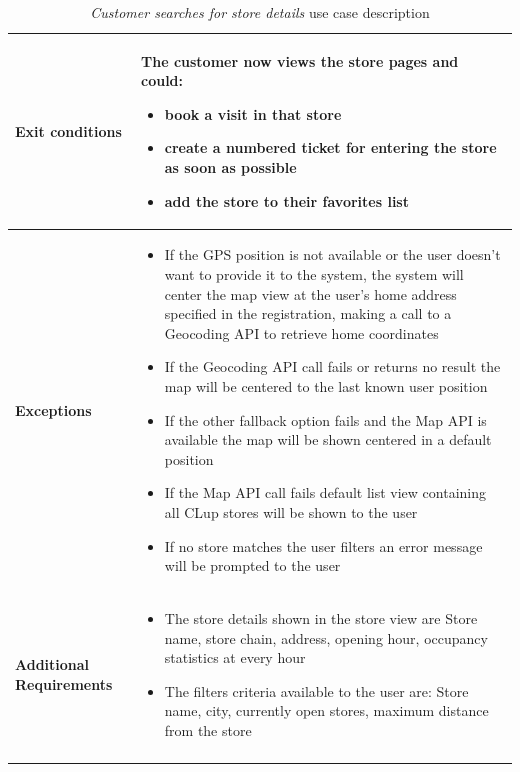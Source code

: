 \begin{longtable}{p{0.25\linewidth}p{0.75\linewidth}}
    \midrule
    \textbf{Exit conditions}                  & The customer now views the store pages and could:
    \begin{itemize}
        \item \textbf{book a visit in that store}
        \item \textbf{create a numbered ticket for entering the store as soon as possible}
        \item \textbf{add the store to their favorites list}
    \end{itemize}                                                                     \\
    \midrule
    \textbf{Exceptions}                       &
    \begin{itemize}
        \item If the GPS position is not available or the user doesn't want to provide it to the system, the system will center the map view at the user's home address specified in the registration, making a call to a Geocoding API to retrieve home coordinates
        \item If the Geocoding API call fails or returns no result the map will be centered to the last known user position
        \item If the other fallback option fails and the Map API is available the map will be shown centered in a default position
        \item If the Map API call fails default list view containing all CLup stores will be shown to the user
        \item If no store matches the user filters an error message will be prompted to the user
    \end{itemize}                                                                    \\
    \midrule
    \textbf{Additional \newline Requirements} &
    \begin{itemize}
        \item The store details shown in the store view are Store name, store chain, address, opening hour, occupancy statistics at every hour
        \item The filters criteria available to the user are: Store name, city, currently open stores, maximum distance from the store
    \end{itemize}                                                                    \\
    \bottomrule
    \caption{\emph{Customer searches for store details} use case description}
\end{longtable}

